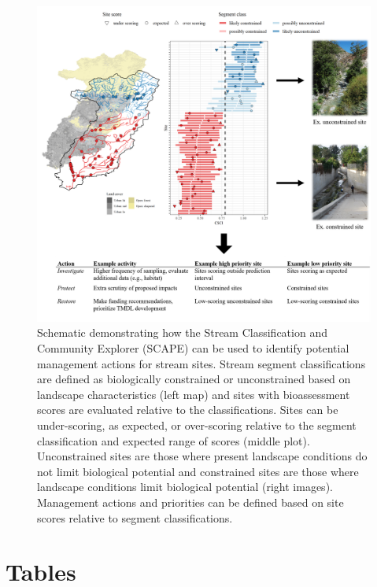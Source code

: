 \documentclass[fleqn,10pt,lineno]{wlpeerj} %
\begin{document}
\begin{figure}
\includegraphics[width=6.97in]{figs/scapex} \caption{Schematic demonstrating how the Stream Classification and Community Explorer (SCAPE) can be used to identify potential management actions for stream sites.  Stream segment classifications are defined as biologically constrained or unconstrained based on landscape characteristics (left map) and sites with bioassessment scores are evaluated relative to the classifications.  Sites can be under-scoring, as expected, or over-scoring relative to the segment classification and expected range of scores (middle plot).  Unconstrained sites are those where present landscape conditions do not limit biological potential and constrained sites are those where landscape conditions limit biological potential (right images).  Management actions and priorities can be defined based on site scores relative to segment classifications.}\label{fig:scapexfig}
\end{figure}

\hypertarget{tables}{%
\section{Tables}\label{tables}}
\end{document}
